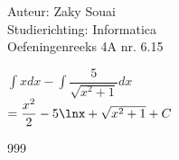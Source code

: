 \documentclass[a4paper]{article}
\begin{document}
  
\noindent \large Auteur: Zaky Souai \\
\noindent \large Studierichting:  Informatica\\
\noindent \large Oefeningenreeks 4A nr. 6.15\\

\bigskip

\normalsize

$\displaystyle\int x dx - \displaystyle\int \dfrac{5}{\sqrt{x^2 + 1}} dx$\\

$= \dfrac{x^2}{2} - 5\lnx + \sqrt{x^2 + 1} + C$ 

\begin{thebibliography}{999}
\end{thebibliography}
\end{document}
